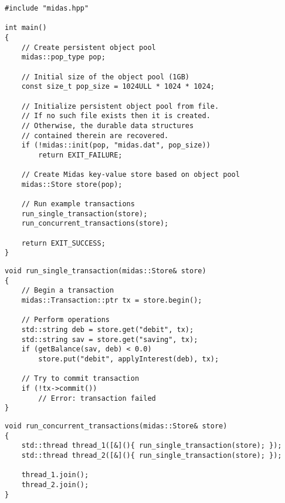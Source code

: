\begin{lstlisting}
#include "midas.hpp"

int main()
{
    // Create persistent object pool
    midas::pop_type pop;

    // Initial size of the object pool (1GB)
    const size_t pop_size = 1024ULL * 1024 * 1024;

    // Initialize persistent object pool from file.
    // If no such file exists then it is created.
    // Otherwise, the durable data structures
    // contained therein are recovered.
    if (!midas::init(pop, "midas.dat", pop_size))
        return EXIT_FAILURE;

    // Create Midas key-value store based on object pool
    midas::Store store(pop);

    // Run example transactions
    run_single_transaction(store);
    run_concurrent_transactions(store);

    return EXIT_SUCCESS;
}
\end{lstlisting}\label{lst:usage-example-lifetime}

\begin{lstlisting}
void run_single_transaction(midas::Store& store)
{
    // Begin a transaction
    midas::Transaction::ptr tx = store.begin();

    // Perform operations
    std::string deb = store.get("debit", tx);
    std::string sav = store.get("saving", tx);
    if (getBalance(sav, deb) < 0.0)
        store.put("debit", applyInterest(deb), tx);

    // Try to commit transaction
    if (!tx->commit())
        // Error: transaction failed
}
\end{lstlisting}\label{lst:usage-single-transaction}

\begin{lstlisting}
void run_concurrent_transactions(midas::Store& store)
{
    std::thread thread_1([&](){ run_single_transaction(store); });
    std::thread thread_2([&](){ run_single_transaction(store); });

    thread_1.join();
    thread_2.join();
}
\end{lstlisting}\label{lst:usage-concurrent-transactions}
